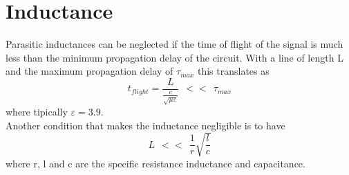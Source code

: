 \section{Inductance}

Parasitic inductances can be neglected if the time of flight of the signal is much less than the minimum propagation delay of the circuit. With a line of length L and the maximum propagation delay of $\tau_{max}$ this translates as 
\begin{equation}
t_{flight}=\frac{L}{\frac{c}{\sqrt{\mu \varepsilon}}}\ \  << \ \ \tau_{max}     
\end{equation}
where tipically $\varepsilon=3.9$.\\
\vspace{5mm}
Another condition that makes the inductance negligible is to have
\begin{equation}
L\ \ <<\ \ \frac{1}{r}\sqrt{\frac{l}{c}}
\end{equation}
where r, l and c are the specific resistance inductance and capacitance.\\
